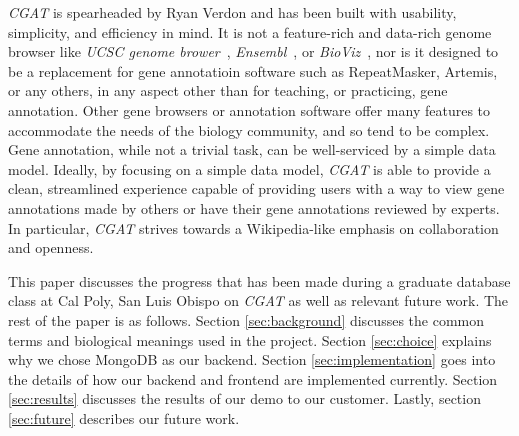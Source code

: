 \documentclass[10pt, conference, compsocconf]{IEEEtran}
\begin{document}
\textit{CGAT} is spearheaded by Ryan Verdon and has been built with usability,
simplicity, and efficiency in mind. It is not a feature-rich and data-rich
genome browser like \textit{UCSC genome brower}~\cite{ucscbrowser},
\textit{Ensembl}~\cite{ensembl}, or \textit{BioViz}~\cite{bioviz}, nor is it
designed to be a replacement for gene annotatioin software such as
RepeatMasker, Artemis, or any others, in any aspect other than for teaching, or
practicing, gene annotation. Other gene browsers or annotation software offer
many features to accommodate the needs of the biology community, and so tend to
be complex. Gene annotation, while not a trivial task, can be well-serviced by
a simple data model. Ideally, by focusing on a simple data model, \textit{CGAT}
is able to provide a clean, streamlined experience capable of providing users
with a way to view gene annotations made by others or have their gene
annotations reviewed by experts. In particular, \textit{CGAT} strives towards a
Wikipedia-like emphasis on collaboration and openness.

This paper discusses the progress that has been made during a graduate database
class at Cal Poly, San Luis Obispo on \textit{CGAT} as well as relevant future
work. The rest of the paper is as follows. Section \ref{sec:background}
discusses the common terms and biological meanings used in the project. Section
\ref{sec:choice} explains why we chose MongoDB as our backend. Section
\ref{sec:implementation} goes into the details of how our backend and frontend
are implemented currently. Section \ref{sec:results} discusses the results of
our demo to our customer. Lastly, section \ref{sec:future} describes our future
work.
\end{document}
